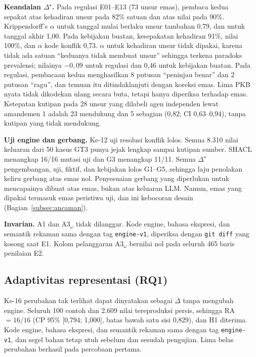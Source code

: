 \documentclass[conference]{IEEEtran}
\makeatletter
\DeclareRobustCommand{\en}[1]{{\usefont{\f@encoding}{\f@family}{\f@series}{it}#1\/}}
\newcommand{\emas}{\star}
\makeatother
\begin{document}
\textbf{Keandalan $\Delta^{\emas}$.} Pada regulasi E01--E13 (73 unsur emas), pembaca kedua sepakat atas kehadiran unsur pada 82\% satuan dan atas nilai pada 90\%. Krippendorff's $\alpha$ untuk tanggal mulai berlaku unsur tambahan 0,79, dan untuk tanggal akhir 1,00. Pada kebijakan buatan, kesepakatan kehadiran 91\%, nilai 100\%, dan $\alpha$ kode konflik 0,73. $\alpha$ untuk kehadiran unsur tidak dipakai, karena tidak ada satuan ``keduanya tidak membuat unsur'' sehingga terkena paradoks prevalensi; nilainya $-0{,}09$ untuk regulasi dan 0,46 untuk kebijakan buatan. Pada regulasi, pembacaan kedua menghasilkan 8 putusan ``peninjau benar'' dan 2 putusan ``ragu'', dan temuan itu ditindaklanjuti dengan koreksi emas. Lima PKB nyata tidak dikodekan ulang secara buta, tetapi hanya diperiksa terhadap emas. Ketepatan kutipan pada 28 unsur yang dilabeli agen independen lewat amandemen 1 adalah 23 mendukung dan 5 sebagian (0,82; CI 0,63--0,94), tanpa kutipan yang tidak mendukung.

\textbf{Uji \en{engine} dan gerbang.} Ke-12 uji resolusi konflik lolos. Semua 8.310 nilai keluaran dari 50 kasus GT3 punya jejak lengkap sampai kutipan sumber. SHACL menangkap 16/16 mutasi uji dan G3 menangkap 11/11. Semua $\Delta^{\emas}$ pengembangan, uji, fiktif, dan kebijakan lolos G1--G5, sehingga laju penolakan keliru gerbang atas emas nol. Penyesuaian gerbang yang diperlukan untuk mencapainya dibuat atas emas, bukan atas keluaran LLM. Namun, emas yang dipakai termasuk emas peristiwa uji, dan ini kebocoran desain (Bagian~\ref{subsec:ancaman}).

\textbf{Invarian.} A1 dan A3$_\omega$ tidak dilanggar. Kode \en{engine}, bahasa ekspresi, dan semantik rekaman sama dengan \en{tag} \texttt{engine-v1}, diperiksa dengan \texttt{git diff} yang kosong saat E1. Kolom pelanggaran A3$_\omega$ bernilai nol pada seluruh 465 baris penilaian E2.

\subsection{Adaptivitas representasi (RQ1)}
\label{subsec:hasil-rq1}
Ke-16 perubahan tak terlihat dapat dinyatakan sebagai $\Delta$ tanpa mengubah \en{engine}. Seluruh 100 contoh dan 2.609 nilai tereproduksi persis, sehingga RA $= 16/16$ (CP 95\% [0,794; 1,000], batas bawah satu sisi 0,829), dan H1 diterima. Kode \en{engine}, bahasa ekspresi, dan semantik rekaman sama dengan \en{tag} \texttt{engine-v1}, dan segel bahan tetap utuh sebelum dan sesudah pengujian. Lima belas perubahan berhasil pada percobaan pertama.
\end{document}
